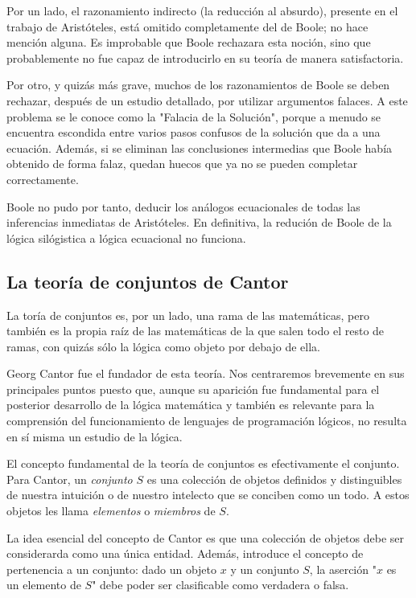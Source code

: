 \documentclass{article}
\begin{document}
Por un lado, el razonamiento indirecto (la reducción al absurdo), presente en el trabajo de Aristóteles, está omitido completamente del de Boole; no hace mención alguna. Es improbable que Boole rechazara esta noción, sino que probablemente no fue capaz de introducirlo en su teoría de manera satisfactoria.

Por otro, y quizás más grave, muchos de los razonamientos de Boole se deben rechazar, después de un estudio detallado, por utilizar argumentos falaces. A este problema se le conoce como la "Falacia de la Solución", porque a menudo se encuentra escondida entre varios pasos confusos de la solución que da a una ecuación. Además, si se eliminan las conclusiones intermedias que Boole había obtenido de forma falaz, quedan huecos que ya no se pueden completar correctamente.

Boole no pudo por tanto, deducir los análogos ecuacionales de todas las inferencias inmediatas de Aristóteles. En definitiva, la redución de Boole de la lógica silógistica a lógica ecuacional no funciona\cite{sanchez2004algebra}.

\subsection{La teoría de conjuntos de Cantor}

La toría de conjuntos es, por un lado, una rama de las matemáticas, pero también es la propia raíz de las matemáticas de la que salen todo el resto de ramas, con quizás sólo la lógica como objeto por debajo de ella\cite{vaught2001set}.

Georg Cantor fue el fundador de esta teoría. Nos centraremos brevemente en sus principales puntos puesto que, aunque su aparición fue fundamental para el posterior desarrollo de la lógica matemática y también es relevante para la comprensión del funcionamiento de lenguajes de programación lógicos, no resulta en sí misma un estudio de la lógica.

El concepto fundamental de la teoría de conjuntos es efectivamente el conjunto. Para Cantor, un \textit{conjunto} $S$ es una colección de objetos definidos y distinguibles de nuestra intuición o de nuestro intelecto que se conciben como un todo. A estos objetos les llama \textit{elementos} o \textit{miembros} de $S$.

La idea esencial del concepto de Cantor es que una colección de objetos debe ser considerarda como una única entidad. Además, introduce el concepto de pertenencia a un conjunto: dado un objeto $x$ y un conjunto $S$, la aserción "$x$ es un elemento de $S$" debe poder ser clasificable como verdadera o falsa.
\end{document}

